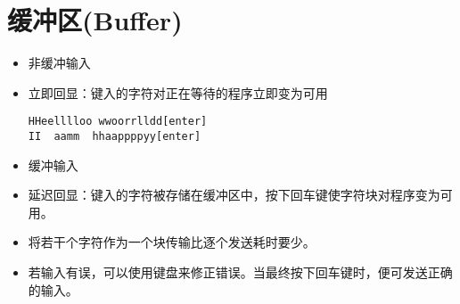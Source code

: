 \section{缓冲区(Buffer)}

\begin{frame}[fragile]\ft{\secname} 
\begin{itemize}
\item    非缓冲输入\\[0.1in]
\item[]  立即回显：键入的字符对正在等待的程序立即变为可用
\begin{lstlisting}
HHeelllloo wwoorrlldd[enter]
II  aamm  hhaappppyy[enter]
\end{lstlisting}
\vspace{0.1in}

\item 缓冲输入\\[0.1in]
\item[] 延迟回显：键入的字符被存储在缓冲区中，按下回车键使字符块对程序变为可用。
\end{itemize}
\end{frame}

\begin{frame}[fragile]
\begin{itemize}
\item 将若干个字符作为一个块传输比逐个发送耗时要少。   \\[0.1in]
\item 若输入有误，可以使用键盘来修正错误。当最终按下回车键时，便可发送正确的输入。
\end{itemize}
\end{frame}
